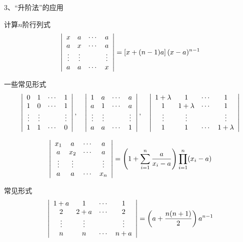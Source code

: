\begin{frame}
  3、“升阶法”的应用
  \begin{li}
    计算$n$阶行列式
    $$
    \left|
      \begin{array}{cccc}
        x & a & \cdots & a \\
        a & x & \cdots & a \\
        \vdots & \vdots & & \vdots \\
        a & a &  \cdots & x 
      \end{array}
    \right|=\left[x+(n-1)a\right](x-a)^{n-1}
    $$
  \end{li}
  一些常见形式
  $$
  \left|
    \begin{array}{cccc}
      0  &  1  & \cdots & 1   \\
      1  &  0  & \cdots & 1   \\
      \vdots& \vdots &     & \vdots \\
      1  &  1  & \cdots & 0 
    \end{array}
  \right|, \quad
  \left|
    \begin{array}{cccc}
      1  &  a  & \cdots & a   \\
      a  &  1  & \cdots & a   \\
      \vdots& \vdots &     & \vdots \\
      a  &  a  & \cdots & 1
    \end{array}
  \right|,\quad 
  \left|
    \begin{array}{cccc}
      1+\lambda  &  1  & \cdots & 1   \\
      1  &  1+\lambda  & \cdots & 1   \\
      \vdots& \vdots &     & \vdots \\
      1  &  1  & \cdots & 1+\lambda 
    \end{array}
  \right| 
  $$

\end{frame}

\begin{frame}
  \begin{li}
    $$
    \left|
      \begin{array}{cccc}
        x_1 &  a  & \cdots & a   \\
        a   & x_2 & \cdots & a   \\
        \vdots & \vdots &     & \vdots \\
        a   &  a  & \cdots & x_n
      \end{array}
    \right|=   \left(1+\sum_{i=1}^n \frac{a}{x_i-a}\right)\prod_{i=1}^n(x_i-a)
    $$
  \end{li}
  常见形式
  $$
  \left|
    \begin{array}{cccc}
      1+a &  1  & \cdots & 1   \\
      2   & 2+a & \cdots & 2  \\
      \vdots & \vdots &     & \vdots \\
      n   &  n  & \cdots & n+a
    \end{array}
  \right|  = \left(a+ \frac{n(n+1)}2\right)a^{n-1}
  $$

\end{frame}

